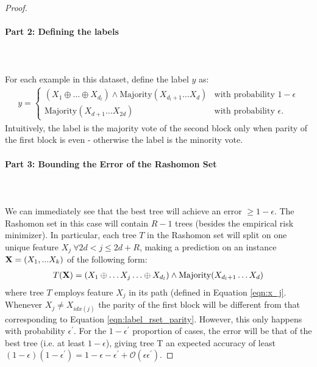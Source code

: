 \begin{proof}
\paragraph{Part 2: Defining the labels}\leavevmode\\\\
For each example in this dataset, define the label $y$ as:
\begin{align}
\label{eqn:label_rset_parity}
y = \begin{cases}
    (X_1 \oplus \ldots\oplus X_{d_l}) \land \textrm{Majority}(X_{d_l+1} \ldots X_{d} ) & \textrm{with probability $1 - \epsilon$}\\
    \textrm{Majority}(X_{d+1} \ldots X_{2d})  & \textrm{with probability $\epsilon$.}
\end{cases} 
\end{align}
Intuitively, the label is the majority vote of the second block only when parity of the first block is even - otherwise the label is the minority vote.
\paragraph{Part 3: Bounding the Error of the Rashomon Set}\leavevmode\\\\
We can immediately see that the best tree will achieve an error $\geq 1-\epsilon$. The Rashomon set in this case will contain $R-1$ trees (besides the empirical risk minimizer). In particular, each tree $T$ in the Rashomon set will split on one unique feature $X_j \ \forall 2d < j \leq 2d+R$, making a prediction on an instance $\mathbf{X} = (X_1,...X_k)$ of the following form: 
\begin{align}
T(\mathbf{X}) = (X_1 \oplus \ldots X_{j} \ldots \oplus X_{d_l}) \land \textrm{Majority}(X_{d_l+1} \ldots X_{d} )
\end{align}
where tree $T$ employs feature $X_j$ in its path (defined in Equation \ref{eqn:x_j}. Whenever $X_j \neq X_{idx(j)}$ the parity of the first block will be different from that corresponding to Equation \ref{eqn:label_rset_parity}. However, this only happens with probability $\epsilon^\prime$. For the $1-\epsilon^\prime$ proportion of cases, the error will be that of the best tree (i.e. at least $1-\epsilon$), giving tree T an expected accuracy of least $(1-\epsilon)(1-\epsilon^\prime) = 1-\epsilon - \epsilon^\prime + \mathcal{O}(\epsilon\epsilon^\prime)$.

\end{proof}
